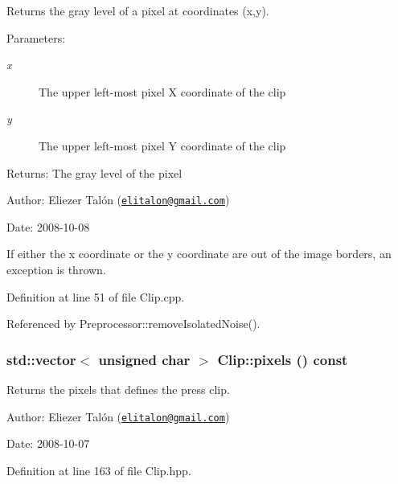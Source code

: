 Returns the gray level of a pixel at coordinates (x,y). 

\begin{Desc}
\item[Parameters:]
\begin{description}
\item[{\em x}]The upper left-most pixel X coordinate of the clip \item[{\em y}]The upper left-most pixel Y coordinate of the clip\end{description}
\end{Desc}
\begin{Desc}
\item[Returns:]The gray level of the pixel\end{Desc}
\begin{Desc}
\item[Author:]Eliezer Talón (\href{mailto:elitalon@gmail.com}{\tt elitalon@gmail.com}) \end{Desc}
\begin{Desc}
\item[Date:]2008-10-08\end{Desc}
If either the x coordinate or the y coordinate are out of the image borders, an exception is thrown. 

Definition at line 51 of file Clip.cpp.

Referenced by Preprocessor::removeIsolatedNoise().\hypertarget{class_clip_c41089906750f03863854504db8f7e5c}{
\subsubsection[pixels]{\setlength{\rightskip}{0pt plus 5cm}std::vector$<$ unsigned char $>$ Clip::pixels () const}}
\label{class_clip_c41089906750f03863854504db8f7e5c}


Returns the pixels that defines the press clip. 

\begin{Desc}
\item[Author:]Eliezer Talón (\href{mailto:elitalon@gmail.com}{\tt elitalon@gmail.com}) \end{Desc}
\begin{Desc}
\item[Date:]2008-10-07 \end{Desc}


Definition at line 163 of file Clip.hpp.

